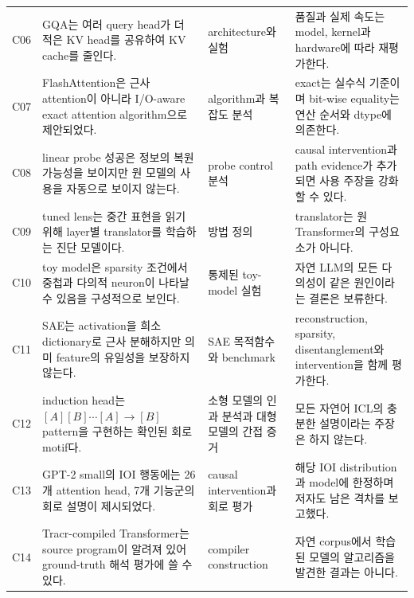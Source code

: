 \begin{longtable}{@{}p{}p{}p{}p{}@{}}
C06 & GQA는 여러 query head가 더 적은 KV head를 공유하여 KV cache를 줄인다. & architecture와 실험 \citep{ainslie2023gqa} & 품질과 실제 속도는 model, kernel과 hardware에 따라 재평가한다. \\

C07 & FlashAttention은 근사 attention이 아니라 I/O-aware exact attention algorithm으로 제안되었다. & algorithm과 복잡도 분석 \citep{dao2022flashattention} & exact는 실수식 기준이며 bit-wise equality는 연산 순서와 dtype에 의존한다. \\

C08 & linear probe 성공은 정보의 복원 가능성을 보이지만 원 모델의 사용을 자동으로 보이지 않는다. & probe control 분석 \citep{hewitt2019probes} & causal intervention과 path evidence가 추가되면 사용 주장을 강화할 수 있다. \\

C09 & tuned lens는 중간 표현을 읽기 위해 layer별 translator를 학습하는 진단 모델이다. & 방법 정의 \citep{belrose2023tunedlens} & translator는 원 Transformer의 구성요소가 아니다. \\

C10 & toy model은 sparsity 조건에서 중첩과 다의적 neuron이 나타날 수 있음을 구성적으로 보인다. & 통제된 toy-model 실험 \citep{elhage2022superposition} & 자연 LLM의 모든 다의성이 같은 원인이라는 결론은 보류한다. \\

C11 & SAE는 activation을 희소 dictionary로 근사 분해하지만 의미 feature의 유일성을 보장하지 않는다. & SAE 목적함수와 benchmark \citep{bricken2023monosemantic,karvonen2025saebench} & reconstruction, sparsity, disentanglement와 intervention을 함께 평가한다. \\

C12 & induction head는 $[A][B]\cdots[A]\to[B]$ pattern을 구현하는 확인된 회로 motif다. & 소형 모델의 인과 분석과 대형 모델의 간접 증거 \citep{olsson2022induction} & 모든 자연어 ICL의 충분한 설명이라는 주장은 하지 않는다. \\

C13 & GPT-2 small의 IOI 행동에는 26개 attention head, 7개 기능군의 회로 설명이 제시되었다. & causal intervention과 회로 평가 \citep{wang2022ioi} & 해당 IOI distribution과 model에 한정하며 저자도 남은 격차를 보고했다. \\

C14 & Tracr-compiled Transformer는 source program이 알려져 있어 ground-truth 해석 평가에 쓸 수 있다. & compiler construction \citep{lindner2023tracr} & 자연 corpus에서 학습된 모델의 알고리즘을 발견한 결과는 아니다. \\


\end{longtable}
